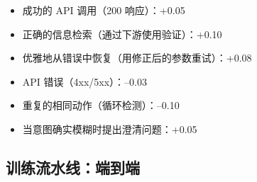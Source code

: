\begin{itemize}
  \item 成功的 API 调用（200 响应）：+0.05
  \item 正确的信息检索（通过下游使用验证）：+0.10
  \item 优雅地从错误中恢复（用修正后的参数重试）：+0.08
  \item API 错误（4xx/5xx）：--0.03
  \item 重复的相同动作（循环检测）：--0.10
  \item 当意图确实模糊时提出澄清问题：+0.05
\end{itemize}

\subsection{训练流水线：端到端}
\label{training-pipeline-end-to-end}

